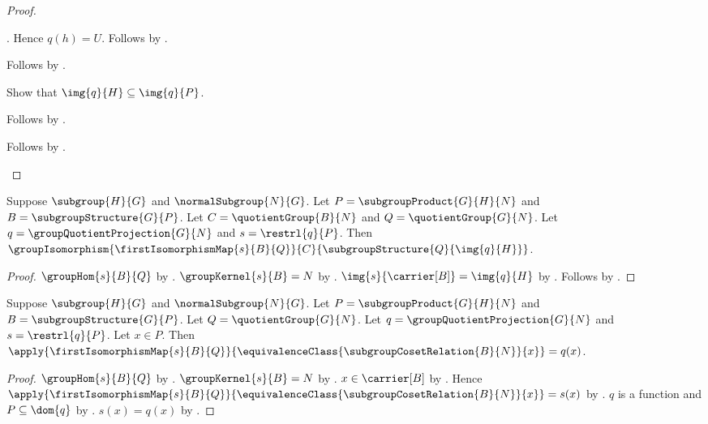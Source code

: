 \begin{proof}
\begin{subproof}
\begin{subproof}
\begin{subproof}
                    .
                Hence $q(h)=U$.
                Follows by
                    .
            \end{subproof}
            Follows by .
        \end{subproof}
        Show that $\img{q}{H}\subseteq\img{q}{P}$.
        \begin{subproof}
            Follows by .
        \end{subproof}
        Follows by .
    \end{subproof}
\end{proof}

\begin{theorem}\label{group_second_isomorphism_image_form}
    Suppose $\subgroup{H}{G}$ and $\normalSubgroup{N}{G}$.
    Let $P=\subgroupProduct{G}{H}{N}$ and
        $B=\subgroupStructure{G}{P}$.
    Let $C=\quotientGroup{B}{N}$ and
        $Q=\quotientGroup{G}{N}$.
    Let $q=\groupQuotientProjection{G}{N}$ and
        $s=\restrl{q}{P}$.
    Then
        $\groupIsomorphism
            {\firstIsomorphismMap{s}{B}{Q}}
            {C}{\subgroupStructure{Q}{\img{q}{H}}}$.
\end{theorem}
\begin{proof}
    $\groupHom{s}{B}{Q}$ by
        .
    $\groupKernel{s}{B}=N$ by
        .
    $\img{s}{\carrier[B]}=\img{q}{H}$ by
        .
    Follows by .
\end{proof}

\begin{proposition}\label{group_second_isomorphism_image_form_apply}
    Suppose $\subgroup{H}{G}$ and $\normalSubgroup{N}{G}$.
    Let $P=\subgroupProduct{G}{H}{N}$ and
        $B=\subgroupStructure{G}{P}$.
    Let $Q=\quotientGroup{G}{N}$.
    Let $q=\groupQuotientProjection{G}{N}$ and
        $s=\restrl{q}{P}$.
    Let $x\in P$.
    Then
        $\apply{\firstIsomorphismMap{s}{B}{Q}}{
            \equivalenceClass{\subgroupCosetRelation{B}{N}}{x}}
        =q(x)$.
\end{proposition}
\begin{proof}
    $\groupHom{s}{B}{Q}$ by
        .
    $\groupKernel{s}{B}=N$ by
        .
    $x\in\carrier[B]$ by .
    Hence
        $\apply{\firstIsomorphismMap{s}{B}{Q}}{
            \equivalenceClass{\subgroupCosetRelation{B}{N}}{x}}
        =s(x)$ by .
    $q$ is a function and $P\subseteq\dom{q}$ by
        .
    $s(x)=q(x)$ by .
\end{proof}

